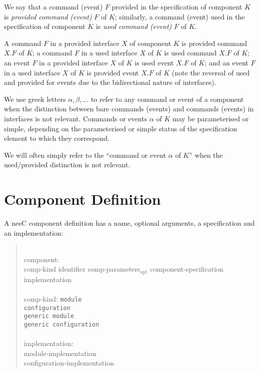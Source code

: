 \documentclass[11pt,letterpaper]{article}
\newcommand{\kw}[1]{{\tt #1}}
\newcommand{\nesc}{nesC\xspace}
\newcommand{\opt}{$_{\mbox{opt}}$\xspace}
\newcommand{\grammarshift}{\vspace*{-.7cm}}
\newcommand{\grammarindent}{\hspace*{2cm}\= \\ \kill}
\begin{document}
We say that a command (event) $F$ provided in the specification of
component $K$ is \emph{provided command (event)} $F$ of $K$; similarly, a
command (event) used in the specification of component $K$ is \emph{used
command (event)} $F$ of $K$.

A command $F$ in a provided interface $X$ of component $K$ is
provided command $X.F$ of $K$; a command $F$ in a used interface
$X$ of $K$ is used command $X.F$ of $K$; an event $F$ in a provided
interface $X$ of $K$ is used event $X.F$ of $K$; and an event $F$
in a used interface $X$ of $K$ is provided event $X.F$ of $K$
(note the reversal of used and provided for events due to the bidirectional
nature of interfaces). 

We use greek letters $\alpha, \beta, \ldots$ to refer to any command or
event of a component when the distinction between bare commands (events)
and commands (events) in interfaces is not relevant. Commands or events
$\alpha$ of $K$ may be parameterised or simple, depending on the
parameterised or simple status of the specification element to which they
correspond.

We will often simply refer to the ``command or event $\alpha$ of $K$'' when
the used/provided distinction is not relevant.  

\section{Component Definition}
\label{sec:component}

A \nesc component definition has a name, optional arguments, a
specification and an implementation:
\begin{quote} \grammarshift \em \begin{tabbing}
\grammarindent
component:\\
\>	comp-kind identifier comp-parameters\opt component-specification implementation\\
\\
comp-kind:
\>	\kw{module}\\
\>	\kw{configuration}\\
\>	\kw{generic module}\\
\>	\kw{generic configuration}\\
\\
implementation:\\
\>	module-implementation\\
\>	configuration-implementation
\end{tabbing} \end{quote}
\end{document}
